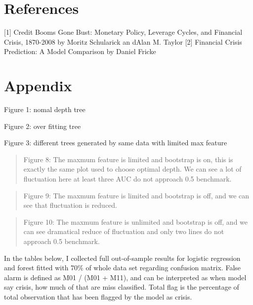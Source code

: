 \documentclass{article}
\newcommand{\ciapdf}[1]{\resizebox{\textwidth}{!}{\texttt{[image: \#1]}}}
\begin{document}
\section*{References}

{[}1{]} Credit Booms Gone Bust: Monetary Policy, Leverage Cycles, and
Financial Crisis, 1870-2008 by Moritz Schularick an dAlan M. Taylor
{[}2{]} Financial Crisis Prediction: A Model Comparison by Daniel Fricke

\section*{Appendix}

Figure 1: nomal depth tree

\ciapdf{app_normaldepth.pdf}

Figure 2: over fitting tree 

\ciapdf{app_overfitting.pdf}

Figure 3:
different trees generated by same data with limited max feature

\ciapdf{app_samedata_1.pdf}

\ciapdf{app_samedata_2.pdf}

\ciapdf{Figure_8.pdf}
\begin{quote}
Figure 8: The maxmum feature is limited and bootstrap is on, this is
exactly the same plot used to choose optimal depth. We can see a lot of
fluctuation here at least three AUC do not approach 0.5 benchmark.
\end{quote}

\ciapdf{Figure_9.pdf}
\begin{quote}
Figure 9: The maxmum feature is limited and bootstrap is off, and we can
see that fluctuation is reduced.
\end{quote}

\ciapdf{Figure_10.pdf}
\begin{quote}
Figure 10: The maxmum feature is unlimited and bootstrap is off, and we
can see dramatical reduce of fluctuation and only two lines do not
approach 0.5 benchmark.
\end{quote}

In the tables below, I collected full out-of-sample results for logistic
regression and forest fitted with 70\% of whole data set regarding confusion matrix. False alarm is defined as
M01 / (M01 + M11), and can be interpreted as when model say crisis, how much of that are
miss classified. Total flag is the percentage of total observation that has been flagged by the model as crisis.
\end{document}
